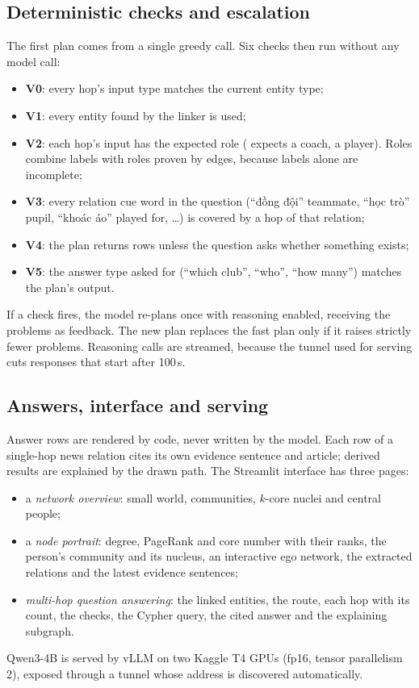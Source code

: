 \documentclass[11pt]{article}
\newcommand{\vi}[1]{\foreignlanguage{vietnamese}{#1}}
\newcommand{\hop}[1]{\texttt{\detokenize{#1}}}
\begin{document}
\subsection{Deterministic checks and escalation}
The first plan comes from a single greedy call. Six checks then run without any model call:
\begin{itemize}
\item \textbf{V0}: every hop's input type matches the current entity type;
\item \textbf{V1}: every entity found by the linker is used;
\item \textbf{V2}: each hop's input has the expected role (\hop{players_coached} expects a coach, \hop{coaches_of_player} a player). Roles combine labels with roles proven by edges, because labels alone are incomplete;
\item \textbf{V3}: every relation cue word in the question (``\vi{đồng đội}'' teammate, ``\vi{học trò}'' pupil, ``\vi{khoác áo}'' played for, \dots) is covered by a hop of that relation;
\item \textbf{V4}: the plan returns rows unless the question asks whether something exists;
\item \textbf{V5}: the answer type asked for (``which club'', ``who'', ``how many'') matches the plan's output.
\end{itemize}
If a check fires, the model re-plans once with reasoning enabled, receiving the problems as feedback. The new plan replaces the fast plan only if it raises strictly fewer problems. Reasoning calls are streamed, because the tunnel used for serving cuts responses that start after 100\,s.

\subsection{Answers, interface and serving}
Answer rows are rendered by code, never written by the model. Each row of a single-hop news relation cites its own evidence sentence and article; derived results are explained by the drawn path. The Streamlit interface has three pages:
\begin{itemize}
\item a \emph{network overview}: small world, communities, $k$-core nuclei and central people;
\item a \emph{node portrait}: degree, PageRank and core number with their ranks, the person's community and its nucleus, an interactive ego network, the extracted relations and the latest evidence sentences;
\item \emph{multi-hop question answering}: the linked entities, the route, each hop with its count, the checks, the Cypher query, the cited answer and the explaining subgraph.
\end{itemize}
Qwen3-4B is served by vLLM on two Kaggle T4 GPUs (fp16, tensor parallelism 2), exposed through a tunnel whose address is discovered automatically.
\end{document}
